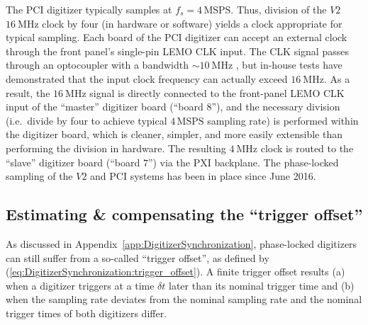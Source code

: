 The PCI digitizer typically samples at $f_s = 4 \, \text{MSPS}$.
Thus, division of the $V2$ $\SI{16}{\mega\hertz}$ clock by four
(in hardware or software) yields a clock appropriate for typical sampling.
Each board of the PCI digitizer can accept an external clock
through the front panel's single-pin LEMO CLK input.
The CLK signal passes through an optocoupler
with a bandwidth $\sim \SI{10}{\mega\hertz}$
\cite{milne_optocoupler_pc16}, but
in-house tests have demonstrated
that the input clock frequency
can actually exceed $\SI{16}{\mega\hertz}$.
As a result, the $\SI{16}{\mega\hertz}$ signal
is directly connected to the front-panel LEMO CLK input
of the ``master'' digitizer board (``board $8$''), and
the necessary division
(i.e.\ divide by four to achieve typical $4 \, \text{MSPS}$ sampling rate)
is performed within the digitizer board,
which is cleaner, simpler, and more easily extensible
than performing the division in hardware.
The resulting $\SI{4}{\mega\hertz}$ clock
is routed to the ``slave'' digitizer board (``board $7$'')
via the PXI backplane.
The phase-locked sampling of the $V2$ and PCI systems
has been in place since June 2016.


\subsection{Estimating \& compensating the ``trigger offset''}
\label{sec:ToroidalCorrelation:ImplementationDetails:trigger_offset}
As discussed in Appendix~\ref{app:DigitizerSynchronization},
phase-locked digitizers can still suffer from
a so-called ``trigger offset'', as defined by
(\ref{eq:DigitizerSynchronization:trigger_offset}).
A finite trigger offset results
(a) when a digitizer triggers at a time $\delta t$ later
than its nominal trigger time and
(b) when the sampling rate deviates from the nominal sampling rate
and the nominal trigger times of both digitizers differ.

